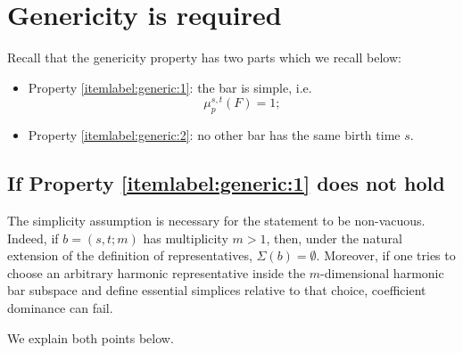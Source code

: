 \documentclass[11pt]{amsart}
\theoremstyle{theorem}
\theoremstyle{remark}
\theoremstyle{definition}
\newcommand{\hide}[1]{}
\begin{document}
\section{Genericity is required}
\label{sec:appendix}
Recall that the genericity property has two parts which we recall below:

\begin{itemize}
\item Property \eqref{itemlabel:generic:1}: the bar is simple, i.e.
\[
\mu_p^{s,t}(F)=1;
\]
\item Property \eqref{itemlabel:generic:2}: 
no other bar has the same birth time \(s\).
\end{itemize}

\subsection{If Property \eqref{itemlabel:generic:1} does not hold}
The simplicity assumption is necessary for the statement to be non-vacuous. Indeed, if $b=(s,t;m)$ has multiplicity $m>1$, then, under the natural extension of the definition of representatives, 
$\Sigma(b) = \emptyset$.
Moreover, if one tries to choose an arbitrary harmonic representative inside the $m$-dimensional harmonic bar subspace and define essential simplices relative to that choice, coefficient dominance can fail.

\hide{



The coefficient-dominance theorem is stated for simple bars, because only then
the harmonic barcode subspace attached to the bar is one-dimensional and hence
is spanned by a single harmonic representative, unique up to nonzero scalar.

If Property \eqref{itemlabel:generic:1} is omitted, then the theorem is not literally well-defined in
the same form: a bar of multiplicity \(m>1\) has a harmonic barcode subspace of
dimension \(m\), not a distinguished harmonic line.

There are two useful facts.

First, under the natural extension of the definition of representatives to a
bar of multiplicity \(m>1\), the set of essential simplices is empty. Thus the
coefficient-dominance statement becomes vacuous.

Second, if one tries to choose an arbitrary nonzero harmonic vector in the
higher-dimensional harmonic bar subspace and define essential simplices relative
to that chosen vector, then coefficient dominance can fail.
}
We explain both points below.
\end{document}
